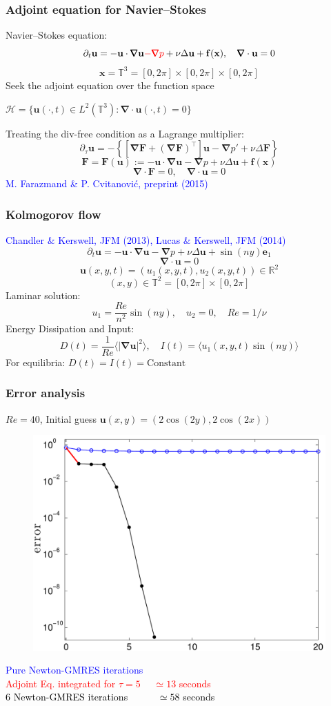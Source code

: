 \documentclass[mathserif]{beamer} %
\newcommand{\vc}{\mathbf}
\newcommand{\bnabla}{\pmb\nabla}
\begin{document}
%
\begin{frame}
\frametitle{Adjoint equation for Navier--Stokes}
Navier--Stokes equation:
$$\partial_t\vc u=-\vc u\cdot\bnabla\vc u\textcolor{red}{-\bnabla p} +\nu \Delta \vc u 
+\vc f(\vc x),
\quad \bnabla\cdot\vc u=0$$
$$\vc x=\mathbb T^3=[0,2\pi]\times[0,2\pi]\times[0,2\pi]$$
\pause
Seek the adjoint equation over the function space\\
\begin{center}
$\mathcal H=\{\vc u(\cdot,t)\in L^2(\mathbb T^3):
\bnabla\cdot \vc u(\cdot,t)=0 \}$
\end{center}
\pause
Treating the div-free condition as a Lagrange multiplier:
$$\partial_\tau\vc u = -\left\{\left[\bnabla\vc F+(\bnabla\vc F)^\top\right]\vc 
u-\bnabla p'+\nu\Delta \vc F\right\}$$
$$\vc F=\vc F(\vc u) := -\vc u\cdot\bnabla\vc u -\bnabla p +\nu\Delta\vc u+\vc 
f(\vc x)$$
$$\bnabla\cdot\vc F=0,\quad \bnabla\cdot\vc u=0$$
{\tiny\textcolor{blue}{M. Farazmand \& P. Cvitanovi\'c, preprint (2015)}}
\end{frame}
%
\begin{frame}
\frametitle{Kolmogorov flow}
{\tiny \textcolor{blue}{Chandler \& Kerswell, JFM (2013), Lucas \& Kerswell, JFM (2014)}}
$$\partial_t\vc u=-\vc u\cdot\bnabla\vc u-\bnabla p +\nu \Delta \vc u +\sin(ny)\vc e_1$$
$$\bnabla\cdot\vc u=0$$
$$\vc u(x,y,t)=(u_1(x,y,t),u_2(x,y,t))\in\mathbb R^2$$
$$(x,y)\in\mathbb T^2=[0,2\pi]\times[0,2\pi]$$
\pause
Laminar solution:
$$u_1=\frac{Re}{n^2}\sin(ny),\quad u_2=0,\quad Re=1/\nu$$
\pause
Energy Dissipation and Input:
$$D(t)=\frac{1}{Re}\langle|\bnabla\vc u|^2\rangle,\quad I(t)=\langle 
u_1(x,y,t)\sin(ny)\rangle$$
For equilibria: $D(t)=I(t)=\mbox{Constant}$
\end{frame}
%
\begin{frame}
\frametitle{Error analysis}
$Re=40$,\hspace{.5cm} Initial guess $\vc u(x,y)=(2\cos(2y),2\cos(2x))$
\begin{figure}
\centering
\includegraphics[width=.75\textwidth]{Kol_R40_n64_err_E1}
\end{figure}
\textcolor{blue}{Pure Newton-GMRES iterations}\\
\textcolor{red}{Adjoint Eq. integrated for $\tau=5$ $\quad\simeq 13$ seconds}\\
\textcolor{black}{6 Newton-GMRES iterations $\quad\quad\;\;\,\simeq 58$ seconds}
\end{frame}
\end{document}
